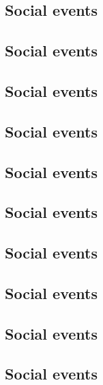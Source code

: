 \subsection{Social events}

\clearpage

\subsection{Social events}

\clearpage

\subsection{Social events}

\clearpage

\subsection{Social events}

\clearpage

\subsection{Social events}

\clearpage

\subsection{Social events}

\clearpage

\subsection{Social events}

\clearpage

\subsection{Social events}

\clearpage

\subsection{Social events}

\clearpage

\subsection{Social events}

\clearpage

